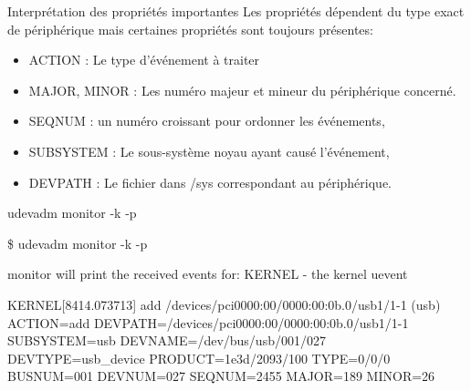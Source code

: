 \documentclass{beamer}
\begin{document}
\begin{frame}
\begin{exampleblock}{Interprétation des propriétés importantes} 
Les propriétés dépendent du type exact de périphérique mais certaines propriétés sont toujours présentes:
\begin{itemize}
	[circle]
	\item ACTION : Le type d’événement à traiter
	\item MAJOR, MINOR : Les numéro majeur et mineur du périphérique concerné. 
    \item SEQNUM : un numéro croissant pour ordonner les événements, 
    \item SUBSYSTEM : Le sous-système noyau ayant causé l’événement, 
	\item DEVPATH : Le fichier dans /sys correspondant au périphérique. 
\end{itemize}
\end{exampleblock}
\end{frame}

\begin{frame}
\begin{exampleblock}{udevadm monitor -k -p} 
	
	\tiny{\$  udevadm monitor -k -p
		
		monitor will print the received events for:
		KERNEL - the kernel uevent
		
		KERNEL[8414.073713] add      /devices/pci0000:00/0000:00:0b.0/usb1/1-1 (usb)\newline
		ACTION=add\newline
		DEVPATH=/devices/pci0000:00/0000:00:0b.0/usb1/1-1\newline
		SUBSYSTEM=usb\newline
		DEVNAME=/dev/bus/usb/001/027\newline
		DEVTYPE=usb\_device\newline
		PRODUCT=1e3d/2093/100\newline
		TYPE=0/0/0\newline
		BUSNUM=001\newline
		DEVNUM=027\newline
		SEQNUM=2455\newline
		MAJOR=189\newline
		MINOR=26\newline}
\end{exampleblock}
 
\end{frame}
\end{document}
